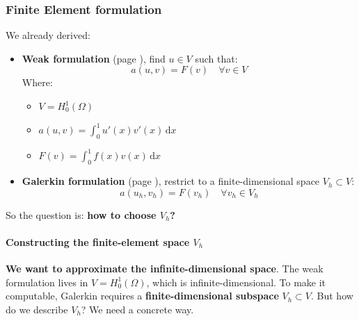 \subsubsection{Finite Element formulation}

We already derived:
\begin{itemize}
    \item \textbf{Weak formulation} (page \pageref{subsubsection: Weak formulation}), find $u \in V$ such that:
    \begin{equation*}
        a(u,v) = F(v) \quad \forall v \in V
    \end{equation*}
    Where:
    \begin{itemize}
        \item $V = H^{1}_{0}\left(\Omega\right)$
        \item $a\left(u,v\right) = \displaystyle\int_{0}^{1} u'\left(x\right)v'\left(x\right)\,\mathrm{d}x$
        \item $F(v) = \displaystyle\int_{0}^{1} f(x)v(x)\,\mathrm{d}x$
    \end{itemize}
    \item \textbf{Galerkin formulation} (page \pageref{subsubsection: Galerkin formulation}), restrict to a finite-dimensional space $V_{h} \subset V$:
    \begin{equation*}
        a(u_h, v_h) = F(v_h) \quad \forall v_h \in V_h
    \end{equation*}
\end{itemize}
So the question is: \textbf{how to choose $V_{h}$?}

\longline

\paragraph[Constructing the finite-element space \texorpdfstring{$V_h$}{Vh}]{Constructing the finite-element space $V_h$}

\textbf{We want to approximate the infinite-dimensional space}. The weak formulation lives in $V = H^{1}_{0}(\Omega)$, which is infinite-dimensional. To make it computable, Galerkin requires a \textbf{finite-dimensional subspace} $V_{h} \subset V$. But how do we describe $V_{h}$? We need a concrete way.

